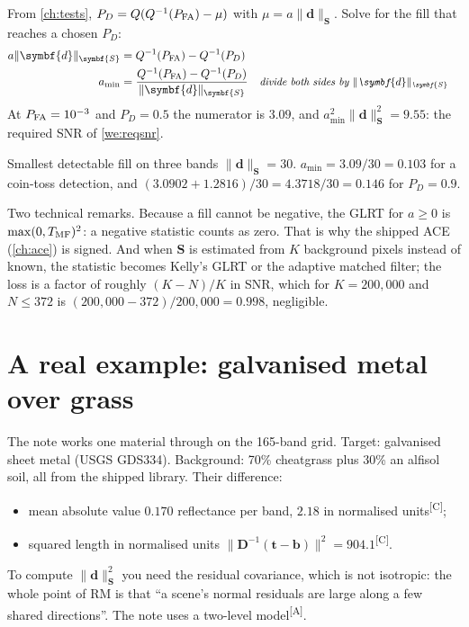 \documentclass[11pt,a4paper,oneside,openany]{book}
\newcommand{\B}[1]{{\symbf{#1}}}
\newcommand{\B}[1]{{\bm{#1}}}
\newcommand{\comp}{\textsuperscript{\textsf{\scriptsize[C]}}}
\newcommand{\assm}{\textsuperscript{\textsf{\scriptsize[A]}}}
\newcommand{\nrm}[1]{\lVert #1\rVert}
\newcommand{\vt}{\B{t}}
\newcommand{\vb}{\B{b}}
\newcommand{\vd}{\B{d}}
\newcommand{\mS}{\B{S}}
\newcommand{\mD}{\B{D}}
\newcommand{\why}[1]{&&\text{\small\itshape #1}}
\begin{document}
From \cref{ch:tests}, $P_D=Q(Q^{-1}(P_{\rm FA})-\mu)$ with $\mu=a\nrm{\vd}_{\mS}$. Solve for the fill that reaches a chosen $P_D$:
\begin{align*}
a\nrm{\vd}_{\mS} &= Q^{-1}(P_{\rm FA})-Q^{-1}(P_D)\\
a_{\min} &= \frac{Q^{-1}(P_{\rm FA})-Q^{-1}(P_D)}{\nrm{\vd}_{\mS}} \why{divide both sides by $\nrm{\vd}_{\mS}$}
\end{align*}
At $P_{\rm FA}=10^{-3}$ and $P_D=0.5$ the numerator is $3.09$, and $a_{\min}^2\nrm{\vd}^2_{\mS}=9.55$: the required SNR of \cref{we:reqsnr}.

\begin{worked}[label=we:amin3]{Smallest detectable fill on three bands}
$\nrm{\vd}_{\mS}=30$. $a_{\min}=3.09/30=0.103$ for a coin-toss detection, and $(3.0902+1.2816)/30=4.3718/30=0.146$ for $P_D=0.9$.
\end{worked}

Two technical remarks. Because a fill cannot be negative, the GLRT for $a\ge0$ is $\max(0,T_{\rm MF})^2$: a negative statistic counts as zero.
That is why the shipped ACE (\cref{ch:ace}) is signed. And when $\mS$ is estimated from $K$ background pixels instead of known, the statistic
becomes Kelly's GLRT or the adaptive matched filter; the loss is a factor of roughly $(K-N)/K$ in SNR, which for $K=200{,}000$ and $N\le372$ is
$(200{,}000-372)/200{,}000=0.998$, negligible.

\section{A real example: galvanised metal over grass}

The note works one material through on the 165-band grid. Target: galvanised sheet metal (USGS GDS334). Background: 70\% cheatgrass plus
30\% an alfisol soil, all from the shipped library. Their difference:
\begin{itemize}
\item mean absolute value $0.170$ reflectance per band, $2.18$ in normalised units\comp;
\item squared length in normalised units $\nrm{\mD^{-1}(\vt-\vb)}^2=904.1$\comp.
\end{itemize}
To compute $\nrm{\vd}^2_{\mS}$ you need the residual covariance, which is not isotropic: the whole point of RM is that ``a scene's normal residuals
are large along a few shared directions''. The note uses a two-level model\assm.
\end{document}
